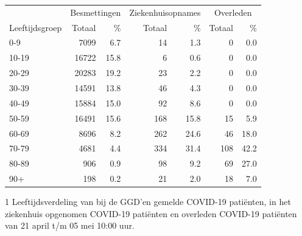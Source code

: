 \documentclass[
  english,
  man,floatsintext]{apa6}
\begin{document}
\begin{table}
\centering\begingroup\fontsize{11}{13}\selectfont

\begin{threeparttable}
\begin{tabular}{lrrrrrr}
\toprule
\multicolumn{1}{c}{ } & \multicolumn{2}{c}{Besmettingen} & \multicolumn{2}{c}{Ziekenhuisopnames} & \multicolumn{2}{c}{Overleden} \\
\cmidrule(l{3pt}r{3pt}){2-3} \cmidrule(l{3pt}r{3pt}){4-5} \cmidrule(l{3pt}r{3pt}){6-7}
Leeftijdsgroep & Totaal & \% & Totaal & \% & Totaal & \%\\
\midrule
0-9 & 7099 & 6.7 & 14 & 1.3 & 0 & 0.0\\
10-19 & 16722 & 15.8 & 6 & 0.6 & 0 & 0.0\\
20-29 & 20283 & 19.2 & 23 & 2.2 & 0 & 0.0\\
30-39 & 14591 & 13.8 & 46 & 4.3 & 0 & 0.0\\
40-49 & 15884 & 15.0 & 92 & 8.6 & 0 & 0.0\\
50-59 & 16491 & 15.6 & 168 & 15.8 & 15 & 5.9\\
60-69 & 8696 & 8.2 & 262 & 24.6 & 46 & 18.0\\
70-79 & 4681 & 4.4 & 334 & 31.4 & 108 & 42.2\\
80-89 & 906 & 0.9 & 98 & 9.2 & 69 & 27.0\\
90+ & 198 & 0.2 & 21 & 2.0 & 18 & 7.0\\
\bottomrule
\end{tabular}
\begin{tablenotes}
\item[1] Leeftijdsverdeling van bij de GGD’en gemelde COVID-19 patiënten, in het ziekenhuis opgenomen COVID-19 patiënten en overleden COVID-19 patiënten van 21 april t/m 05 mei 10:00 uur.
\end{tablenotes}
\end{threeparttable}
\endgroup{}
\end{table}

\newpage
\end{document}
